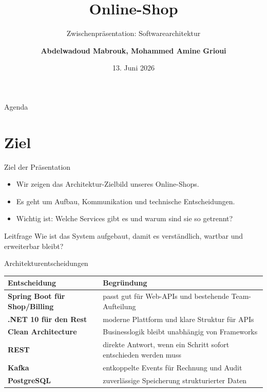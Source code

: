 \documentclass[aspectratio=169,11pt]{beamer}
\title[Online-Shop Architektur]{Online-Shop}
\subtitle{Zwischenpräsentation: Softwarearchitektur}
\author{\textbf{Abdelwadoud Mabrouk, Mohammed Amine Grioui}}
\institute{\textbf{Fachhochschule Südwestfalen}\\\textbf{Vertiefung Software Engineering}\\\textbf{SS 2026}}
\date{13. Juni 2026}
\begin{document}
\begin{frame}
    \titlepage
\end{frame}

\begin{frame}{Agenda}
    \tableofcontents
\end{frame}

\section{Ziel}

\begin{frame}{Ziel der Präsentation}
    \begin{itemize}
        \item Wir zeigen das Architektur-Zielbild unseres Online-Shops.
        \item Es geht um Aufbau, Kommunikation und technische Entscheidungen.
        \item Wichtig ist: Welche Services gibt es und warum sind sie so getrennt?
    \end{itemize}

    \vspace{.5cm}
    \begin{block}{Leitfrage}
        Wie ist das System aufgebaut, damit es verständlich, wartbar und erweiterbar bleibt?
    \end{block}
\end{frame}

\begin{frame}{Architekturentscheidungen}
    \begin{tabular}{>{\bfseries}p{4cm}p{10.25cm}}
        \toprule
        Entscheidung & Begründung \\
        \midrule
        Spring Boot für Shop/Billing & passt gut für Web-APIs und bestehende Team-Aufteilung \\
        .NET 10 für den Rest & moderne Plattform und klare Struktur für APIs \\
        Clean Architecture & Businesslogik bleibt unabhängig von Frameworks \\
        REST & direkte Antwort, wenn ein Schritt sofort entschieden werden muss \\
        Kafka & entkoppelte Events für Rechnung und Audit \\
        PostgreSQL & zuverlässige Speicherung strukturierter Daten \\
        \bottomrule
    \end{tabular}
\end{frame}
\end{document}

